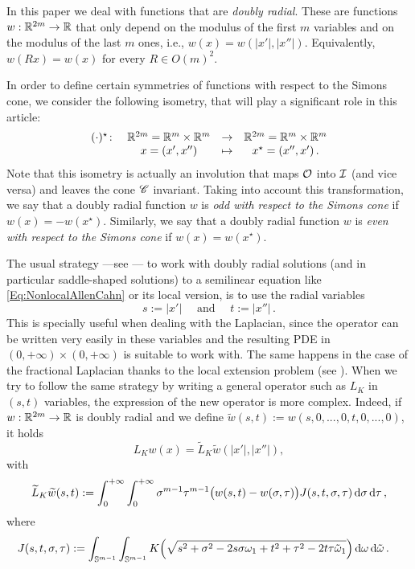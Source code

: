 In this paper we deal with functions that are \emph{doubly radial}. These are functions $w:\mathbb{R}^{2m}  \to \mathbb{R}$ that only depend on the modulus of the first $m$ variables and on the modulus of the last $m$ ones, i.e., $w(x) = w(|x'|,|x''|)$. Equivalently, $w(Rx) = w(x)$ for every $R \in O(m)^2$.

In order to define certain symmetries of functions with respect to the Simons cone, we consider the following isometry, that will play a significant role in this article:
\begin{equation}
\label{Eq:DefStar}
\begin{matrix}
(\cdot)^\star \colon & \mathbb{R}^{2m}= \mathbb{R}^{m}\times \mathbb{R}^{m}  &\to&  \mathbb{R}^{2m}= \mathbb{R}^{m}\times \mathbb{R}^{m}  \\
& x = (x',x'') &\mapsto & x^\star = (x'',x')\,.
\end{matrix}
\end{equation}
Note that this isometry is actually an involution that maps $\mathcal{O}$ into $\mathcal{I}$ (and vice versa) and leaves the cone $\mathscr{C}$ invariant. Taking into account this transformation, we say that a doubly radial function $w$ is \emph{odd with respect to the Simons cone} if $w(x) = -w(x^\star)$. Similarly, we say that a doubly radial function $w$ is \emph{even with respect to the Simons cone} if $w(x) = w(x^\star)$.

The usual strategy ---see \cite{CabreTerraI, CabreTerraII,Cabre-Saddle, CabreRosOton-DoubleRev, Cinti-Saddle, Cinti-Saddle2}--- to work with doubly radial solutions (and in particular saddle-shaped solutions) to a semilinear equation like \eqref{Eq:NonlocalAllenCahn} or its local version, is to use the radial variables 
$$
s := |x'| \quad \text{ and } \quad t:=|x''|\,.
$$
This is specially useful when dealing with the Laplacian, since the operator can be written very easily in these variables and the resulting PDE in $(0,+\infty)\times (0,+\infty)$ is suitable to work with. The same happens in the case of the fractional Laplacian thanks to the local extension problem (see \cite{CaffarelliSilvestre}). When we try to follow the same strategy by writing a general operator such as $L_K$ in $(s,t)$ variables, the expression of the new operator is more complex. Indeed, if $w:\mathbb{R}^{2m} \to \mathbb{R}$ is doubly radial and we define $\widetilde{w}(s,t) := w(s,0,...,0,t,0,...,0)$, it holds
$$ L_Kw(x) = \widetilde{L}_K \widetilde{w} (|x'|,|x''|), $$
with
$$
\widetilde{L}_K \widetilde{w} (s,t) := \int_0^{+\infty}  \int_0^{+\infty} \sigma^{m-1} \tau^{m-1} \big(w(s,t) - w(\sigma, \tau)\big) J(s,t,\sigma, \tau)  \,\mathrm{d} \sigma\,\mathrm{d} \tau\,,
$$
where
\begin{align*}
J(s,t,\sigma, \tau) &:= \int_{\mathbb{S}^{m-1}}  \int_{\mathbb{S}^{m-1}} K\Big( \sqrt{s^2+\sigma^2- 2 s \sigma \omega_1 + t^2 + \tau^2 - 2t \tau\tilde\omega_1}\Big) \,\mathrm{d} \omega \,\mathrm{d} \tilde\omega\,.
\end{align*}

